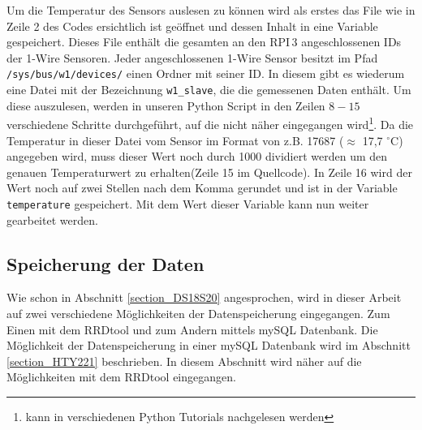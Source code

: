

Um die Temperatur des Sensors auslesen zu können wird als erstes das File wie in Zeile 2 des Codes ersichtlich ist geöffnet und dessen Inhalt in eine Variable gespeichert. Dieses File enthält die gesamten an den \ac{RPI}\,3 angeschlossenen IDs der 1-Wire Sensoren. Jeder angeschlossenen 1-Wire Sensor besitzt im Pfad \texttt{/sys/bus/w1/devices/} einen Ordner mit seiner ID. In diesem gibt es wiederum eine Datei mit der Bezeichnung \texttt{w1\_slave}, die die gemessenen Daten enthält. Um diese auszulesen, werden in unseren Python Script in den Zeilen $8-15$ verschiedene Schritte durchgeführt, auf die nicht näher eingegangen wird\footnote{kann in verschiedenen Python Tutorials nachgelesen werden}. Da die Temperatur in dieser Datei vom Sensor im Format von z.B. 17687 ($\approx$ 17,7 $^\circ$C) angegeben wird, muss dieser Wert noch durch 1000 dividiert werden um den genauen Temperaturwert zu erhalten(Zeile 15 im Quellcode). In Zeile 16 wird der Wert noch auf zwei Stellen nach dem Komma gerundet und ist in der Variable \texttt{temperature} gespeichert. Mit dem Wert dieser Variable kann nun weiter gearbeitet werden.

\subsection{Speicherung der Daten}
\label{subsectio_Datenspeicherung_DS18S20}
Wie schon in Abschnitt \ref{section_DS18S20} angesprochen, wird in dieser Arbeit auf zwei verschiedene Möglichkeiten der Datenspeicherung eingegangen. Zum Einen mit dem RRDtool und zum Andern mittels mySQL Datenbank. Die Möglichkeit der Datenspeicherung in einer mySQL Datenbank wird im Abschnitt \ref{section_HTY221} beschrieben. In diesem Abschnitt wird näher auf die Möglichkeiten mit dem RRDtool eingegangen.

